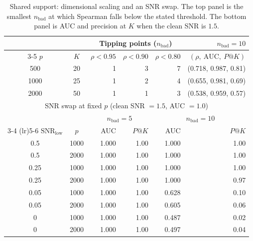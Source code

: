 \begin{table}[t]
\centering
\caption{Shared support: dimensional scaling and an SNR swap.
The top panel is the smallest \(n_{\mathrm{bad}}\) at which Spearman falls
below the stated threshold.
The bottom panel is AUC and precision at \(K\) when the clean SNR is \(1.5\).}
\label{tab:federated_shared_support}
\small
\setlength{\tabcolsep}{4pt}
\begin{tabular}{c c rrr r}
\toprule
 & & \multicolumn{3}{c}{Tipping points (\(n_{\mathrm{bad}}\))} & \(n_{\mathrm{bad}}=10\) \\
\cmidrule(lr){3-5}
\(p\) & \(K\) & \(\rho<0.95\) & \(\rho<0.90\) & \(\rho<0.80\) & \((\rho,\ \mathrm{AUC},\ P@K)\) \\
\midrule
500  & 20 & 1 & 3 & 7 & (0.718, 0.987, 0.81) \\
1000 & 25 & 1 & 2 & 4 & (0.655, 0.981, 0.69) \\
2000 & 50 & 1 & 1 & 3 & (0.538, 0.959, 0.57) \\
\midrule
\multicolumn{6}{c}{SNR swap at fixed \(p\) (clean SNR \(=1.5\), AUC \(=1.0\))} \\
\midrule
 & & \multicolumn{2}{c}{\(n_{\mathrm{bad}}=5\)} & \multicolumn{2}{c}{\(n_{\mathrm{bad}}=10\)} \\
\cmidrule(lr){3-4} \cmidrule(lr){5-6}
\(\mathrm{SNR}_{\mathrm{low}}\) & \(p\) & AUC & \(P@K\) & AUC & \(P@K\) \\
\midrule
0.5  & 1000 & 1.000 & 1.00 & 1.000 & 1.00 \\
0.5  & 2000 & 1.000 & 1.00 & 1.000 & 1.00 \\
0.25 & 1000 & 1.000 & 1.00 & 1.000 & 1.00 \\
0.25 & 2000 & 1.000 & 1.00 & 1.000 & 0.97 \\
0.05 & 1000 & 1.000 & 1.00 & 0.628 & 0.10 \\
0.05 & 2000 & 1.000 & 1.00 & 0.605 & 0.06 \\
0    & 1000 & 1.000 & 1.00 & 0.487 & 0.02 \\
0    & 2000 & 1.000 & 1.00 & 0.497 & 0.04 \\
\bottomrule
\end{tabular}
\end{table}

